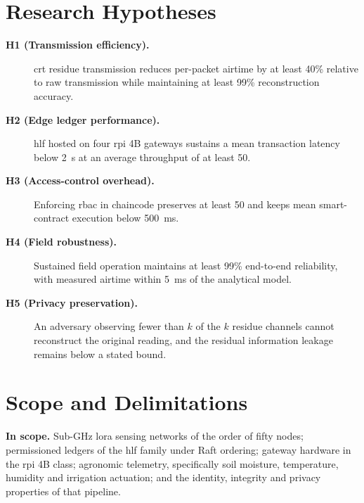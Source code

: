 \documentclass[12pt,a4paper,oneside]{book}
\begin{document}
\section{Research Hypotheses}
\label{sec:hypotheses}

\begin{description}
  \item[\textnormal{\textbf{H1 (Transmission efficiency).}}] \gls{crt} residue
        transmission reduces per-packet airtime by at least 40\% relative to raw
        transmission while maintaining at least 99\% reconstruction accuracy.

  \item[\textnormal{\textbf{H2 (Edge ledger performance).}}] \gls{hlf} hosted on
        four \gls{rpi} 4B gateways sustains a mean transaction latency below
        \SI{2}{\second} at an average throughput of at least \SI{50}{\tps}.

  \item[\textnormal{\textbf{H3 (Access-control overhead).}}] Enforcing
        \gls{rbac} in chaincode preserves at least \SI{50}{\tps} and keeps mean
        smart-contract execution below \SI{500}{\milli\second}.

  \item[\textnormal{\textbf{H4 (Field robustness).}}] Sustained field operation
        maintains at least 99\% end-to-end reliability, with measured airtime
        within \SI{5}{\milli\second} of the analytical model.

  \item[\textnormal{\textbf{H5 (Privacy preservation).}}] An adversary observing
        fewer than $k$ of the $k$ residue channels cannot reconstruct the
        original reading, and the residual information leakage remains below a
        stated bound.
\end{description}



\section{Scope and Delimitations}
\label{sec:scope}

\textbf{In scope.} Sub-GHz \gls{lora} sensing networks of the order of fifty
nodes; permissioned ledgers of the \gls{hlf} family under Raft ordering;
gateway hardware in the \gls{rpi} 4B class; agronomic telemetry, specifically
soil moisture, temperature, humidity and irrigation actuation; and the
identity, integrity and privacy properties of that pipeline.
\end{document}
